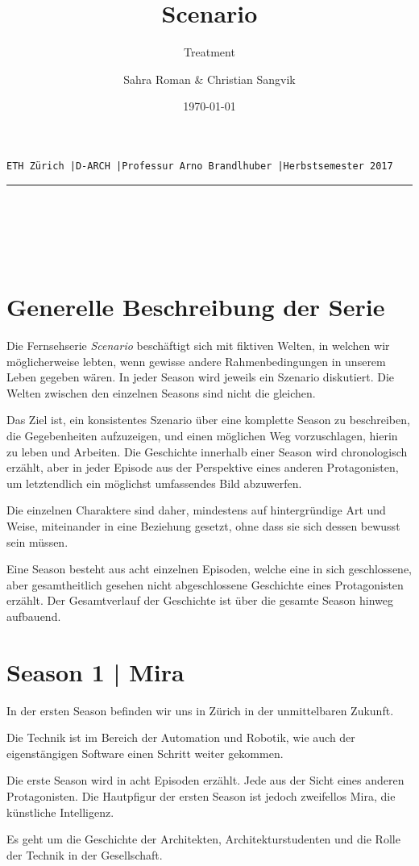 \documentclass[11pt,a4paper,ngerman]{scrreprt}
\author{Sahra Roman \& Christian Sangvik}
\date{\today}
\title{Scenario}
\subtitle{Treatment}
\makeatletter
\newcommand{\linia}{\rule{.8\textwidth}{.1pt}}
\renewcommand{\maketitle}{
  \pagestyle{empty}
  \begin{center}
        \uppercase{\texttt{\tiny{ETH Zürich
          \enspace{}|\enspace{}D-ARCH
          \enspace{}|\enspace{}Professur Arno Brandlhuber
          \enspace{}|\enspace{}Herbstsemester 2017}}}\\ \linia{}\\
          \vspace*{7cm} \uppercase{\Huge{\MakeUppercase{\@title}}}\\
          \vspace*{2cm} \uppercase{\LARGE{\MakeUppercase{\@subtitle}}}\\
          \vspace*{4cm} \uppercase{\large{\MakeUppercase{\@author}}}\\
        \clearpage
      \end{center}
  \pagestyle{myheadings}
  }
\makeatother
\begin{document}
\maketitle
\setcounter{page}{1}

\chapter*{Generelle Beschreibung der Serie}

Die Fernsehserie \emph{Scenario} beschäftigt sich mit fiktiven Welten, in welchen wir
möglicherweise lebten, wenn gewisse andere Rahmenbedingungen in unserem Leben
gegeben wären. In jeder Season wird jeweils ein Szenario diskutiert. Die Welten
zwischen den einzelnen Seasons sind nicht die gleichen.

Das Ziel ist, ein konsistentes Szenario über eine komplette Season zu
beschreiben, die Gegebenheiten aufzuzeigen, und einen möglichen Weg
vorzuschlagen, hierin zu leben und Arbeiten.  Die Geschichte innerhalb einer
Season wird chronologisch erzählt, aber in jeder Episode aus der Perspektive
eines anderen Protagonisten, um letztendlich ein möglichst umfassendes Bild
abzuwerfen.

Die einzelnen Charaktere sind daher, mindestens auf hintergründige Art und
Weise, miteinander in eine Beziehung gesetzt, ohne dass sie sich dessen bewusst
sein müssen.

Eine Season besteht aus acht einzelnen Episoden, welche eine in sich
geschlossene, aber gesamtheitlich gesehen nicht abgeschlossene Geschichte eines
Protagonisten erzählt. Der Gesamtverlauf der Geschichte ist über die gesamte
Season hinweg aufbauend.

\chapter*{Season 1 | Mira}

In der ersten Season befinden wir uns in Zürich in der unmittelbaren Zukunft.

Die Technik ist im Bereich der Automation und Robotik, wie auch der
eigenstängigen Software einen Schritt weiter gekommen.

Die erste Season wird in acht Episoden erzählt. Jede aus der Sicht eines anderen
Protagonisten. Die Hautpfigur der ersten Season ist jedoch zweifellos Mira, die
künstliche Intelligenz.

Es geht um die Geschichte der Architekten, Architekturstudenten und die Rolle
der Technik in der Gesellschaft.
\end{document}
